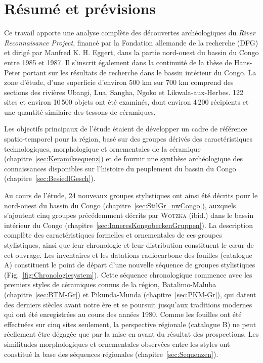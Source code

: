 \section*{Résumé et prévisions}
\begin{multicols}{2}
\raggedcolumns
\noindent Ce travail apporte une analyse complète des découvertes archéologiques du \textit{River Reconnaisance Project}, financé par la Fondation allemande de la recherche (DFG) et dirigé par Manfred K. H. Eggert, dans la partie nord-ouest du bassin du Congo entre 1985 et 1987. Il s’inscrit également dans la continuité de la thèse de Hans-Peter \textcite{Wotzka.1995} portant sur les résultats de recherche dans le bassin intérieur du Congo. La zone d’étude, d’une superficie d’environ 500 km sur 700 km comprend des sections des rivières \mbox{Ubangi}, Lua, \mbox{Sangha}, \mbox{Ngoko} et \mbox{Likwala}-\mbox{aux}-\mbox{Herbes}. 122 sites et environ 10\,500 objets ont été examinés, dont environ 4\,200 récipients et une quantité similaire des tessons de céramiques.

Les objectifs principaux de l’étude étaient de développer un cadre de référence spatio-temporel pour la région, basé sur des groupes dérivés des caractéristiques technologiques, morphologique et ornementales de la céramique (chapitre~\ref{sec:Keramiksequenz}) et de fournir une synthèse archéologique des connaissances disponibles sur l’histoire du peuplement du bassin du Congo (chapitre~\ref{sec:BesiedlGesch}).

Au cours de l'étude, 24 nouveaux groupes stylistiques ont ainsi été décrits pour le nord-ouest du bassin du Congo (chapitre~\ref{sec:StilGr_nwCongo}), auxquels s’ajoutent cinq groupes précédemment décrits par \textsc{Wotzka} (ibid.) dans le bassin intérieur du Congo (chapitre~\ref{sec:InneresKongobeckenGruppen}). La description complète des caractéristiques formelles et ornementales de ces groupes stylistiques, ainsi que leur chronologie et leur distribution constituent le cœur de cet ouvrage. Les inventaires et les datations radiocarbone des fouilles (catalogue A) constituent le point de départ d'une nouvelle séquence de groupes stylistiques (Fig.~\ref{fig:Chronologiesystem}). Cette séquence chronologique commence avec les premiers styles de céramiques connus de la région, Batalimo-Maluba (chapitre~\ref{sec:BTM-Gr}) et Pikunda-Munda (chapitre~\ref{sec:PKM-Gr}), qui datent des  derniers siècles avant notre ère et se poursuit jusqu'aux traditions modernes qui ont été enregistrées au cours des années 1980. Comme les fouilles ont été effectuées sur cinq sites seulement, la perspective régionale (catalogue B) ne peut réellement être dégagée que par la mise en avant du résultat des prospections. Les similitudes morphologiques et ornementales observées entre les styles ont constitué la base des séquences régionales (chapitre~\ref{sec:Sequenzen}).


\end{multicols}

